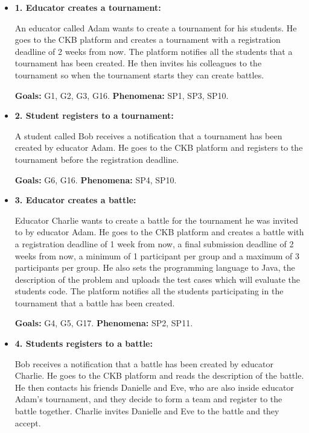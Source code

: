 \documentclass{article}
\begin{document}
\begin{itemize}
    \item \textbf{1. Educator creates a tournament:} 
    
    An educator called Adam wants to create a tournament for his students. He goes to the CKB platform and creates a tournament with a registration deadline of 2 weeks from now. The platform notifies all the students that a tournament has been created. He then invites his colleagues to the tournament so when the tournament starts they can create battles.

    \textbf{Goals:} G1, G2, G3, G16.
    \textbf{Phenomena:} SP1, SP3, SP10.

    \item \textbf{2. Student registers to a tournament:}
    
    A student called Bob receives a notification that a tournament has been created by educator Adam. He goes to the CKB platform and registers to the tournament before the registration deadline.

    \textbf{Goals:} G6, G16.
    \textbf{Phenomena:} SP4, SP10.

    \item \textbf{3. Educator creates a battle:}
    
    Educator Charlie wants to create a battle for the tournament he was invited to by educator Adam. He goes to the CKB platform and creates a battle with a registration deadline of 1 week from now, a final submission deadline of 2 weeks from now, a minimum of 1 participant per group and a maximum of 3 participants per group. He also sets the programming language to Java, the description of the problem and uploads the test cases which will evaluate the students code. The platform notifies all the students participating in the tournament that a battle has been created.

    \textbf{Goals:} G4, G5, G17.
    \textbf{Phenomena:} SP2, SP11.

    \item \textbf{4. Students registers to a battle:}
    
    Bob receives a notification that a battle has been created by educator Charlie. He goes to the CKB platform and reads the description of the battle. He then contacts his friends Danielle and Eve, who are also inside educator Adam's tournament, and they decide to form a team and register to the battle together. Charlie invites Danielle and Eve to the battle and they accept. 


\end{itemize}
\end{document}
